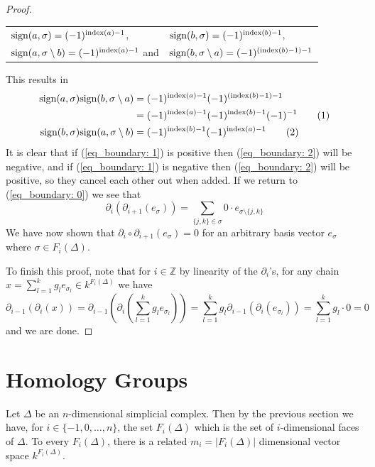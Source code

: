 \documentclass[11pt,a4paper,twoside, openright]{report}
\newcommand\numberthis{\addtocounter{equation}{1}\tag{\theequation}}
\begin{document}
\begin{proof}
\begin{tabular}{l l}
$\textnormal{sign}(a,\sigma) = (-1)^{\textnormal{index}(a)-1}$,  &$\textnormal{sign}(b,\sigma) = (-1)^{\textnormal{index}(b)-1}$,\\
$\textnormal{sign}(a,\sigma\setminus b) = (-1)^{\textnormal{index}(a)-1}$ and &$\textnormal{sign}(b,\sigma\setminus a) = (-1)^{(\textnormal{index}(b)-1)-1}$
\end{tabular}

This results in
\begin{align*}
\textnormal{sign}(a,\sigma)\textnormal{sign}(b,\sigma\setminus a) &= (-1)^{\textnormal{index}(a)-1}(-1)^{(\textnormal{index}(b)-1)-1}\\
&= (-1)^{\textnormal{index}(a)-1}(-1)^{\textnormal{index}(b)-1}(-1)^{-1} \numberthis\label{eq_boundary: 1} \\
\textnormal{sign}(b,\sigma)\textnormal{sign}(a,\sigma\setminus b) &= (-1)^{\textnormal{index}(b)-1}(-1)^{\textnormal{index}(a)-1} \numberthis \label{eq_boundary: 2}\\
\end{align*}
It is clear that if (\ref{eq_boundary: 1}) is positive then (\ref{eq_boundary: 2}) will be negative, and if (\ref{eq_boundary: 1}) is negative then (\ref{eq_boundary: 2}) will be positive, so they cancel each other out when added. If we return to (\ref{eq_boundary: 0}) we see that 
\begin{equation*}
\partial_i(\partial_{i+1}(e_\sigma))=\sum_{\{j,k\}\in\sigma}0\cdot e_{\sigma\setminus\{j,k\}} 
\end{equation*}
We have now shown that $\partial_i\circ\partial_{i+1}(e_\sigma)=0$ for an arbitrary basis vector $e_\sigma$ where $\sigma\in F_i(\Delta)$. 

To finish this proof, note that for $i \in\mathbb{Z}$ by linearity of the $\partial_i$'s, for any chain $x = \sum_{l=1}^kg_le_{\sigma_l}\in k^{F_i(\Delta)}$ we have 
\begin{equation*}
\partial_{i-1}(\partial_i(x)) = \partial_{i-1}\left(\partial_i\left(\sum_{l=1}^kg_le_{\sigma_l}\right)\right) = \sum_{l=1}^kg_l\partial_{i-1}(\partial_i(e_{\sigma_l}))=\sum_{l=1}^kg_l\cdot 0=0
\end{equation*}
and we are done.
\end{proof}

\section{Homology Groups}
Let $\Delta$ be an $n$-dimensional simplicial complex. Then by the previous section we have, for $i\in\{-1,0,\dots,n\}$, the set $F_i(\Delta)$ which is the set of $i$-dimensional faces of $\Delta$. To every $F_i(\Delta)$, there is a related $m_i = |F_i(\Delta)|$ dimensional vector space $k^{F_i(\Delta)}$.
\end{document}
